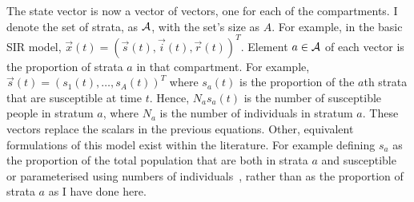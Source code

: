 \documentclass[thesis.tex]{subfiles}
\begin{document}
The state vector is now a vector of vectors, one for each of the compartments.
I denote the set of strata, as $\mathcal{A}$, with the set's size as $A$.
For example, in the basic SIR model, $\vec{x}(t) = (\vec{s}(t), \vec{i}(t), \vec{r}(t))^T$.
Element $a \in \mathcal{A}$ of each vector is the proportion of strata $a$ in that compartment.
For example, $\vec{s}(t) = (s_1(t), \dots, s_A(t))^T$ where $s_a(t)$ is the proportion of the $a$th strata that are susceptible at time $t$.
Hence, $N_a s_a(t)$ is the number of susceptible people in stratum $a$, where $N_a$ is the number of individuals in stratum $a$.
These vectors replace the scalars in the previous equations.
Other, equivalent formulations of this model exist within the literature.
For example defining $s_a$ as the proportion of the total population that are both in strata $a$ and susceptible or parameterised using numbers of individuals~\autocite[57]{keelingModeling}, rather than as the proportion of strata $a$ as I have done here.
\end{document}
